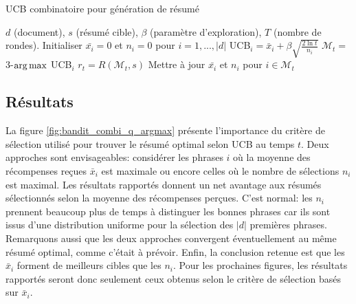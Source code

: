 \begin{algorithm}
    \caption{UCB combinatoire pour génération de résumé}
    \begin{algorithmic}[1]
        \Require $d$ (document), $s$ (résumé cible), $\beta$ (paramètre d'exploration), $T$ (nombre de rondes).
        \State Initialiser $\bar{x_i} =0$ et $n_i = 0$ pour $i = 1, ..., |d|$
        \State UCB$_i = \bar{x}_i + \beta \sqrt{\frac{2 \ln t}{n_i}}$
        \EndFor
        \State $\mathcal{M}_t =$ 3-$\operatorname*{arg\,max}$ UCB$_i$
        \State $r_t = R(\mathcal{M}_t, s)$
        \State Mettre à jour $\bar{x_i}$ et $n_i$ pour {$i \in \mathcal{M}_t$}
        \EndFor
    \end{algorithmic}
    \label{alg:cible_ucb}
\end{algorithm}

\subsection{Résultats}
\label{subsec:ucb_resultats}

La figure \ref{fig:bandit_combi_q_argmax} présente l'importance du critère de sélection
utilisé pour trouver le résumé optimal selon UCB au temps $t$.
Deux approches sont envisageables: considérer les phrases $i$ où la moyenne des récompenses reçues
$\bar{x}_i$ est maximale ou encore celles où le nombre de sélections $n_i$ est maximal.
Les résultats rapportés donnent un net avantage aux résumés sélectionnés selon la moyenne des
récompenses perçues.
C'est normal: les $n_i$ prennent beaucoup plus de temps à distinguer les bonnes phrases
car ils sont issus d'une distribution uniforme pour la sélection des $|d|$ premières phrases.
Remarquons aussi que les deux approches convergent éventuellement au même résumé optimal,
comme c'était à prévoir.
Enfin, la conclusion retenue est que les $\bar{x}_i$ forment de meilleurs cibles que les $n_i$.
Pour les prochaines figures, les résultats rapportés seront donc seulement ceux obtenus 
selon le critère de sélection basés sur $\bar{x}_i$.

